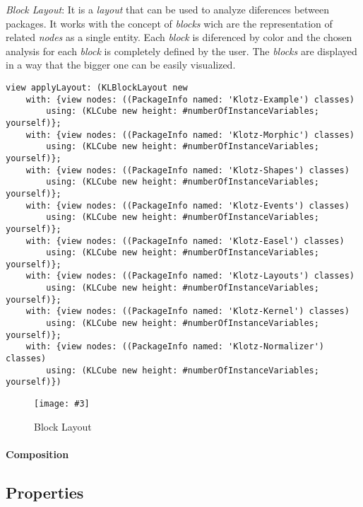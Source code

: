\documentclass[runningheads]{llncs}
\newcommand{\fig}[4]{
	\begin{figure}[#1]
		\centering
		\texttt{[image: \#3]}
		\caption{\label{fig:#3}#4}
	\end{figure}}
\newcommand{\seclabel}[1]{\label{sec:#1}}
\begin{document}
\emph{Block Layout}: It is a \emph{layout} that can be used to 
analyze diferences between packages. It works with the concept
of \emph{blocks} wich are the representation of related \emph{nodes}
as a single entity. Each \emph{block} is diferenced by color and the
chosen analysis for each \emph{block} is completely defined by the
user. The \emph{blocks} are displayed in a way that the bigger one
can be easily visualized.
\begin{lstlisting}
view applyLayout: (KLBlockLayout new
	with: {view nodes: ((PackageInfo named: 'Klotz-Example') classes) 
		using: (KLCube new height: #numberOfInstanceVariables; yourself)};
	with: {view nodes: ((PackageInfo named: 'Klotz-Morphic') classes)
		using: (KLCube new height: #numberOfInstanceVariables; yourself)};
	with: {view nodes: ((PackageInfo named: 'Klotz-Shapes') classes)
		using: (KLCube new height: #numberOfInstanceVariables; yourself)};
	with: {view nodes: ((PackageInfo named: 'Klotz-Events') classes)
		using: (KLCube new height: #numberOfInstanceVariables; yourself)};		
	with: {view nodes: ((PackageInfo named: 'Klotz-Easel') classes)
		using: (KLCube new height: #numberOfInstanceVariables; yourself)};
	with: {view nodes: ((PackageInfo named: 'Klotz-Layouts') classes)
		using: (KLCube new height: #numberOfInstanceVariables; yourself)};
	with: {view nodes: ((PackageInfo named: 'Klotz-Kernel') classes)
		using: (KLCube new height: #numberOfInstanceVariables; yourself)};
	with: {view nodes: ((PackageInfo named: 'Klotz-Normalizer') classes)
		using: (KLCube new height: #numberOfInstanceVariables; yourself)})
\end{lstlisting}
\fig{}{0.7}{figure9.png}{Block Layout}

\paragraph{Composition}

\subsection{Properties} \seclabel{properties}
\end{document}
